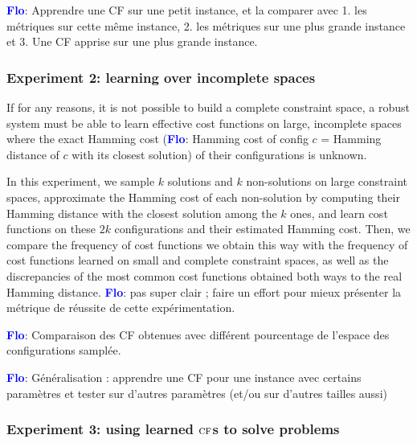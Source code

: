 \documentclass{article}
\newcommand{\csp}{\textsc{CSP}\xspace}
\newcommand{\cfn}{\textsc{CFN}\xspace}
\newcommand{\cf}{\textsc{cf}\xspace}
\newcommand{\flo}{\textcolor{blue}{\bf Flo}\xspace}
\begin{document}
\flo: Apprendre une CF sur une petit instance, et la comparer avec 1. les métriques  sur cette  même instance,  2.  les métriques  sur une  plus grande instance et 3. Une CF apprise sur une plus grande instance.

\subsubsection{Experiment 2: learning over incomplete spaces}

If for any reasons, it is not possible to build a complete constraint space, a robust system must be able to learn effective cost functions on large,  incomplete spaces where the exact Hamming cost  (\flo: Hamming cost of config $c$ =  Hamming distance of $c$ with its closest solution) of their configurations is unknown.

In this experiment,  we sample $k$ solutions and  $k$ non-solutions on large constraint spaces,  approximate the  Hamming cost of each non-solution by computing their  Hamming distance with the closest solution among the $k$ ones, and learn cost functions on these $2k$ configurations and their estimated Hamming cost. Then, we compare the frequency of cost functions we obtain this way with the frequency of cost functions learned on small and complete constraint spaces, as well as the discrepancies of the most common cost functions obtained both ways to the real Hamming distance. \flo: pas super clair ; faire un  effort pour  mieux  présenter  la métrique  de  réussite de  cette expérimentation. 

\flo:  Comparaison  des  CF  obtenues avec  différent  pourcentage  de
l'espace des configurations samplée.

\flo: Généralisation  : apprendre  une CF  pour une  instance avec  certains
paramètres  et  tester sur  d'autres  paramètres  (et/ou sur  d'autres
tailles aussi)

\subsubsection{Experiment 3: using learned $\cf$s to solve problems}

\end{document}
